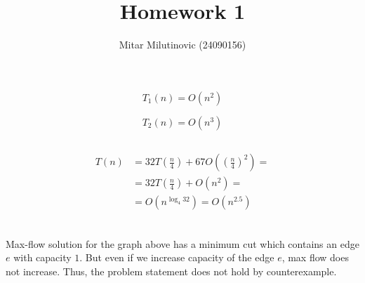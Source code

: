 \documentclass[a4paper,11pt,oneside,onecolumn]{article}
\title{Homework 1}
\author{Mitar Milutinovic (24090156)}
\begin{document}
\maketitle

\section{}

\subsection{}

$$ T_1(n) = O(n^2) $$

$$ T_2(n) = O(n^3) $$

\subsection{}

\begin{align*}
T(n) & = 32 T\left(\frac{n}{4}\right) + 67 O\left( \left(\frac{n}{4}\right)^2 \right) = \\
     & = 32 T\left( \frac{n}{4} \right) + O\left( n^2 \right) = \\
     & = O\left( n^{\log_4 32} \right) = O\left(n^{2.5}\right) \\
\end{align*}

\subsection{}

\begin{center}
\end{center}

Max-flow solution for the graph above has a minimum cut which contains an edge $e$ with capacity $1$.
But even if we increase capacity of the edge $e$, max flow does not increase. Thus, the problem statement
does not hold by counterexample.
\end{document}
